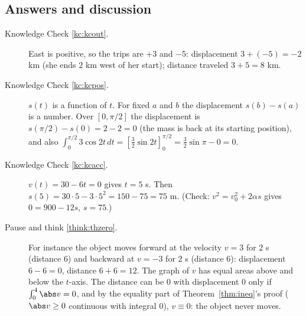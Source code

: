 \documentclass[11pt]{article}
\begin{document}
\subsection*{Answers and discussion}

\begin{description}

  \item[Knowledge Check \ref{kc:kcout}.] East is positive, so the trips are $+3$ and $-5$: displacement $3+(-5)=-2$ km (she ends $2$ km west of her start); distance traveled $3+5=8$ km.

  \item[Knowledge Check \ref{kc:kcpos}.] $s(t)$ is a function of $t$. For fixed $a$ and $b$ the displacement $s(b)-s(a)$ is a number. Over $[0,\pi/2]$ the displacement is $s(\pi/2)-s(0)=2-2=0$ (the mass is back at its starting position), and also $\int_0^{\pi/2}3\cos2t\,dt=\left[\frac32\sin2t\right]_0^{\pi/2}=\frac32\sin\pi-0=0$.

  \item[Knowledge Check \ref{kc:kcacc}.] $v(t)=30-6t=0$ gives $t=5$ s. Then $s(5)=30\cdot5-3\cdot5^2=150-75=75$ m. (Check: $v^2=v_0^2+2\alpha s$ gives $0=900-12s$, $s=75$.)

  \item[Pause and think \ref{think:thzero}.] For instance the object moves forward at the velocity $v=3$ for $2$ s (distance $6$) and backward at $v=-3$ for $2$ s (distance $6$): displacement $6-6=0$, distance $6+6=12$. The graph of $v$ has equal areas above and below the $t$-axis. The distance can be $0$ with displacement $0$ only if $\int_0^4\abs v=0$, and by the equality part of Theorem~\ref{thm:ineq}'s proof ($\abs v\ge0$ continuous with integral $0$), $v\equiv0$: the object never moves.


\end{description}
\end{document}
